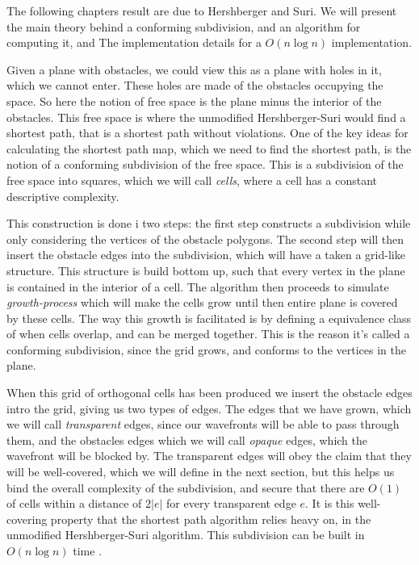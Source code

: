 \label{chapter:conformingsubdivision}

The following chapters result are due to Hershberger and Suri\cite{HershbergerS99}. 
We will present the main theory behind a conforming subdivision, 
and an algorithm for computing it, and The implementation details for a $O(n \log n)$
implementation.

Given a plane with obstacles, we could view this as a plane with holes in it, which we 
cannot enter. These holes are made of the obstacles occupying the space. So here the notion 
of free space is the plane minus the interior of the obstacles. This free space is where the 
unmodified Hershberger-Suri would find a shortest path, that is a shortest path without 
violations. One of the key ideas for calculating the shortest path map, which we need to 
find the shortest path, is the notion of a conforming subdivision of the free space. This is 
a subdivision of the free space into squares, which we will call \textit{cells}, where a 
cell has a constant descriptive complexity. 

This construction is done i two steps: the 
first step constructs a subdivision while only considering the vertices of the obstacle 
polygons. The second step will then insert the obstacle edges into the subdivision, which 
will have a taken a grid-like structure. This structure is build bottom up, such that every 
vertex in the plane is contained in the interior of a cell. The algorithm then proceeds to 
simulate \textit{growth-process} which will make the cells grow until then entire plane is 
covered by these cells. The way this growth is facilitated is by defining a equivalence 
class of when cells overlap, and can be merged together. This is the reason it's called a 
conforming subdivision, since the grid grows, and conforms to the vertices in the plane. 


When this grid of orthogonal cells has been produced we insert the obstacle edges intro the 
grid, giving us two types of edges. The edges that we have grown, which we will call 
\textit{transparent} edges, since our wavefronts will be able to pass through them, and the 
obstacles edges which we will call \textit{opaque} edges, which the wavefront will be 
blocked by. The transparent edges will obey the claim that they will be well-covered, 
which we will define in the next section, but this helps us bind the overall complexity of 
the subdivision, and secure that there are $O(1)$ of cells within a distance of $2|e|$ for 
every transparent edge $e$. It is this well-covering property that the shortest path 
algorithm relies heavy on, in the unmodified Hershberger-Suri algorithm. This subdivision 
can be built in $O(n \log n)$ time \cite{HershbergerS99}.

